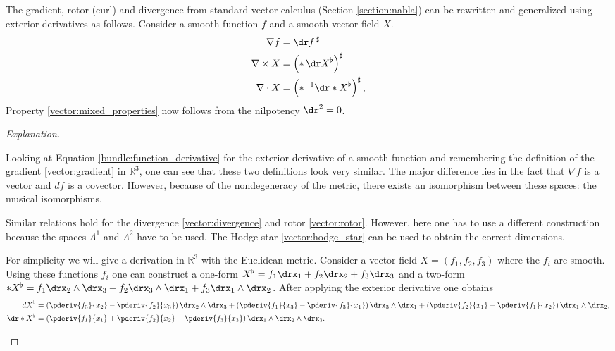     \begin{remark}\label{bundle:vector_calculus}
        The gradient, rotor (curl) and divergence from standard vector calculus (Section \ref{section:nabla}) can be rewritten and generalized using exterior derivatives as follows. Consider a smooth function $f$ and a smooth vector field $X$.
        \begin{align}
            \nabla f &= \dr f\,^\sharp\\
            \nabla\times X &= \left(\ast\,\dr X^\flat\right)^\sharp\\
            \nabla\cdot X &= \left(\ast^{-1}\dr\ast X^\flat\right)^\sharp,
        \end{align}
        Property \ref{vector:mixed_properties} now follows from the nilpotency $\dr^2=0$.\\
        \begin{proof}[Explanation]
            \begin{mdframed}[roundcorner=10pt, linecolor=blue, linewidth=1pt]
                Looking at Equation \eqref{bundle:function_derivative} for the exterior derivative of a smooth function and remembering the definition of the gradient \ref{vector:gradient} in $\mathbb{R}^3$, one can see that these two definitions look very similar. The major difference lies in the fact that $\nabla f$ is a vector and $df$ is a covector. However, because of the nondegeneracy of the metric, there exists an isomorphism between these spaces: the musical isomorphisms.

                Similar relations hold for the divergence \ref{vector:divergence} and rotor \ref{vector:rotor}. However, here one has to use a different construction because the spaces $\Lambda^1$ and $\Lambda^2$ have to be used. The Hodge star \ref{vector:hodge_star} can be used to obtain the correct dimensions.

                For simplicity we will give a derivation in $\mathbb{R}^3$ with the Euclidean metric. Consider a vector field $X = (f_1,f_2,f_3)$ where the $f_i$ are smooth. Using these functions $f_i$ one can construct a one-form $X^\flat = f_1\drx_1 + f_2\drx_2 + f_3\drx_3$ and a two-form $\ast X^\flat = f_1\drx_2\wedge\drx_3 + f_2\drx_3\wedge\drx_1 + f_3\drx_1\wedge\drx_2$. After applying the exterior derivative one obtains
                \begin{align}
                    dX^\flat &= \left(\pderiv{f_3}{x_2} - \pderiv{f_2}{x_3}\right)\drx_2\wedge\drx_3 + \left(\pderiv{f_1}{x_3} - \pderiv{f_3}{x_1}\right)\drx_3\wedge\drx_1 + \left(\pderiv{f_2}{x_1} - \pderiv{f_1}{x_2}\right)\drx_1\wedge\drx_2,\nonumber\\
                    \dr\ast X^\flat &= \left(\pderiv{f_1}{x_1} + \pderiv{f_2}{x_2} + \pderiv{f_3}{x_3}\right)\drx_1\wedge\drx_2\wedge\drx_3.\nonumber
                \end{align}
            \end{mdframed}
        \end{proof}
    \end{remark}

